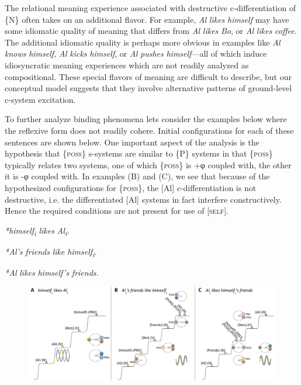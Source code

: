   The relational meaning experience associated with destructive c-differentiation of \{N\} often takes on an additional flavor. For example, \textit{Al} \textit{likes} \textit{himself} may have some idiomatic quality of meaning that differs from \textit{Al} \textit{likes} \textit{Bo}, or \textit{Al} \textit{likes} \textit{coffee}. The additional idiomatic quality is perhaps more obvious in examples like \textit{Al} \textit{knows} \textit{himself,} \textit{Al} \textit{kicks} \textit{himself}, or \textit{Al} \textit{pushes} \textit{himself}—all of which induce idiosyncratic meaning experiences which are not readily analyzed as compositional. These special flavors of meaning are difficult to describe, but our conceptual model suggests that they involve alternative patterns of ground-level c-system excitation.

  To further analyze binding phenomena lets consider the examples below where the reflexive form does not readily cohere. Initial configurations for each of these sentences are shown below. One important aspect of the analysis is the hypothesis that \{\textsc{poss}\} s-systems are similar to \{P\} systems in that \{\textsc{poss}\} typically relates two systems, one of which \{\textsc{poss}\} is +φ coupled with, the other it is -φ coupled with. In examples (B) and (C), we see that because of the hypothesized configurations for \{\textsc{poss}\}, the [Al] c-differentiation is not destructive, i.e. the differentiated [Al] systems in fact interfere constructively. Hence the required conditions are not present for use of [\textsc{self}]. 

\textit{*himself\textsubscript{i}} \textit{likes} \textit{Al\textsubscript{i}}.

\textit{*Al’s} \textit{friends} \textit{like} \textit{himself\textsubscript{i}}.

\textit{*Al} \textit{likes} \textit{himself’s} \textit{friends.}

  
\begin{figure}
\includegraphics[width=\textwidth]{figures/Tilsen-img157.png}
\caption{\missingcaption}
\label{fig:}
\end{figure}
 

